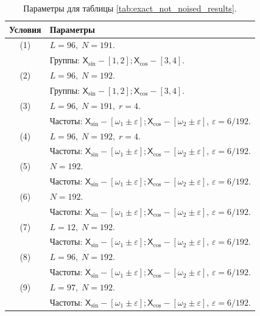 \documentclass[12pt, specialist, subf
]{disser}
\theoremstyle{definition}
\newcommand{\TS}{\mathsf{X}}
\begin{document}
\begin{table}[H]
  \caption{Параметры для таблицы \ref{tab:exact_not_noised_results}.}
  \centering
  \label{tab:exact_not_noised_parameters}
  \begin{tabularx}{\textwidth}{|c|X|}
    \hline
    \textbf{Условия} & \textbf{Параметры} \\
    \hline
    (1) & \( L = 96,\; N = 191 \). \\ & Группы: $\TS_{\sin} - [1,2]; \TS_{\cos} - [3,4]$. \\
    \hline
    (2) & \( L = 96,\; N = 192 \). \\ & Группы: $\TS_{\sin} - [1,2]; \TS_{\cos} - [3,4]$. \\
    \hline
    (3) & \( L = 96,\; N = 191,\; r = 4\). \\
            & Частоты: $\TS_{\sin} - [\omega_1 \pm \varepsilon]; \TS_{\cos} - [\omega_2 \pm \varepsilon]$, $\varepsilon = 6/192$. \\
    \hline
    (4) & \( L = 96,\; N = 192,\; r = 4 \). \\
            & Частоты: $\TS_{\sin} - [\omega_1 \pm \varepsilon]; \TS_{\cos} - [\omega_2 \pm \varepsilon]$, $\varepsilon = 6/192$. \\
    \hline
    (5) & \( N = 192 \). \\
            & Частоты: $\TS_{\sin} - [\omega_1 \pm \varepsilon]; \TS_{\cos} - [\omega_2 \pm \varepsilon]$, $\varepsilon = 6/192$. \\
    \hline
    (6) & \( N = 192 \). \\
            & Частоты: $\TS_{\sin} - [\omega_1 \pm \varepsilon]; \TS_{\cos} - [\omega_2 \pm \varepsilon]$, $\varepsilon = 6/192$. \\
    \hline
    (7) & \(L = 12,\;N = 192 \). \\
            & Частоты: $\TS_{\sin} - [\omega_1 \pm \varepsilon]; \TS_{\cos} - [\omega_2 \pm \varepsilon]$, $\varepsilon = 6/192$. \\
    \hline
    (8) & \( L = 96,\; N = 192 \). \\
            & Частоты: $\TS_{\sin} - [\omega_1 \pm \varepsilon]; \TS_{\cos} - [\omega_2 \pm \varepsilon]$, $\varepsilon = 6/192$. \\
    \hline
    (9) & \( L = 97,\; N = 192 \). \\
            & Частоты: $\TS_{\sin} - [\omega_1 \pm \varepsilon]; \TS_{\cos} - [\omega_2 \pm \varepsilon]$, $\varepsilon = 6/192$. \\
    \hline
  \end{tabularx}
\end{table}
\end{document}
